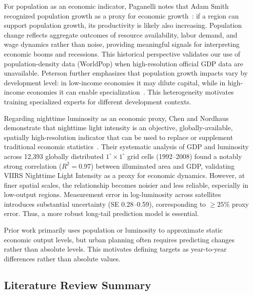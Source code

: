 \documentclass[preprint,12pt]{elsarticle}
\begin{document}
For population as an economic indicator, Paganelli notes that Adam Smith recognized population growth as a proxy for economic growth~\cite{paganelli2021populationgdp}: if a region can support population growth, its productivity is likely also increasing. Population change reflects aggregate outcomes of resource availability, labor demand, and wage dynamics rather than noise, providing meaningful signals for interpreting economic booms and recessions. This historical perspective validates our use of population-density data (WorldPop) when high-resolution official GDP data are unavailable. Peterson further emphasizes that population growth impacts vary by development level: in low-income economies it may dilute capital, while in high-income economies it can enable specialization~\cite{peterson2017rolepopulation}. This heterogeneity motivates training specialized experts for different development contexts.

Regarding nighttime luminosity as an economic proxy, Chen and Nordhaus demonstrate that nighttime light intensity is an objective, globally-available, spatially high-resolution indicator that can be used to replace or supplement traditional economic statistics~\cite{chen2011luminosity}. Their systematic analysis of GDP and luminosity across 12,393 globally distributed $1^{\circ} \times 1^{\circ}$ grid cells (1992--2008) found a notably strong correlation ($R^2 = 0.97$) between illuminated area and GDP, validating VIIRS Nighttime Light Intensity as a proxy for economic dynamics. However, at finer spatial scales, the relationship becomes noisier and less reliable, especially in low-output regions. Measurement error in log-luminosity across satellites introduces substantial uncertainty (SE 0.28--0.59), corresponding to $\ge 25\%$ proxy error. Thus, a more robust long-tail prediction model is essential.

Prior work primarily uses population or luminosity to approximate static economic output levels, but urban planning often requires predicting changes rather than absolute levels. This motivates defining targets as year-to-year differences rather than absolute values.

\subsection{Literature Review Summary}
\end{document}
